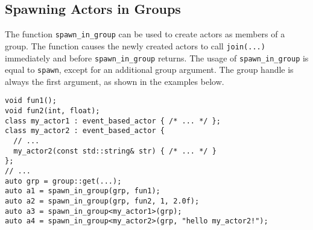 \clearpage
\subsection{Spawning Actors in Groups}

The function \lstinline^spawn_in_group^ can be used to create actors as members of a group.
The function causes the newly created actors to call \lstinline^join(...)^ immediately and before \lstinline^spawn_in_group^ returns. 
The usage of \lstinline^spawn_in_group^ is equal to \lstinline^spawn^, except for an additional group argument.
The group handle is always the first argument, as shown in the examples below.

\begin{lstlisting}
void fun1();
void fun2(int, float);
class my_actor1 : event_based_actor { /* ... */ };
class my_actor2 : event_based_actor {
  // ...
  my_actor2(const std::string& str) { /* ... */ }
};
// ...
auto grp = group::get(...);
auto a1 = spawn_in_group(grp, fun1);
auto a2 = spawn_in_group(grp, fun2, 1, 2.0f);
auto a3 = spawn_in_group<my_actor1>(grp);
auto a4 = spawn_in_group<my_actor2>(grp, "hello my_actor2!");
\end{lstlisting}
